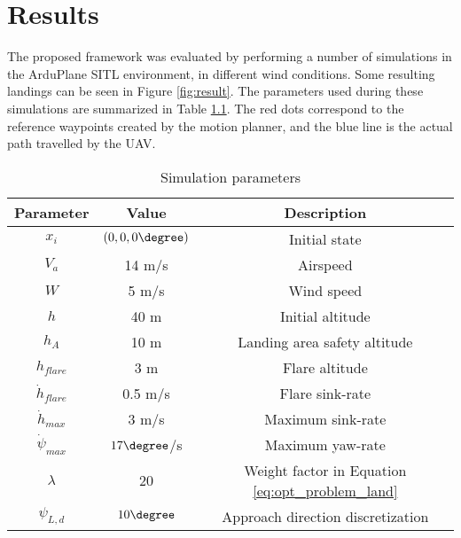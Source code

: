 \chapter{Results}\label{cha:results}

The proposed framework was evaluated by performing a number of simulations in the ArduPlane SITL environment, in different wind conditions. 
Some resulting landings can be seen in Figure \ref{fig:result}. The parameters used during these simulations are summarized in Table \ref{tab:sim_params}.
The red dots correspond to the reference waypoints created by the motion planner, and the blue line is the actual path travelled by the UAV.

\begin{table}[H]
    \begin{center}
        \begin{tabular}{|c|c|c|}
            \hline
            \textbf{Parameter} & \textbf{Value} & \textbf{Description}\\
            \hline
            $x_i$ & $(0,0,0\degree)$ & Initial state \\
            \hline
            $V_a$ & 14 m/s & Airspeed \\
            \hline
            $W$ & 5 m/s & Wind speed \\
            \hline
            $h$ & 40 m & Initial altitude \\
            \hline
            $h_A$ & 10 m & Landing area safety altitude \\
            \hline
            $h_{flare}$ & 3 m & Flare altitude \\
            \hline
            $\dot{h}_{flare}$ & 0.5 m/s & Flare sink-rate\\
            \hline
            $\dot{h}_{max}$ & 3 m/s & Maximum sink-rate \\
            \hline
            $\dot{\psi}_{max}$ & $17\degree$/s & Maximum yaw-rate\\
            \hline
            $\lambda$ & 20 & Weight factor in Equation \eqref{eq:opt_problem_land} \\
            \hline
            $\psi_{L,d}$ & $10\degree$ & Approach direction discretization \\
            \hline
        \end{tabular}        
    \end{center}
    \caption{Simulation parameters}
    \label{tab:sim_params}
\end{table}

